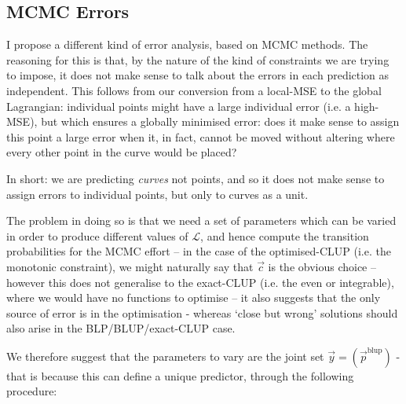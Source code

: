 \documentclass[]{article}
\begin{document}


				

		\subsection{MCMC Errors}

			I propose a different kind of error analysis, based on MCMC methods. The reasoning for this is that, by the nature of the kind of constraints we are trying to impose, it does not make sense to talk about the errors in each prediction as independent. This follows from our conversion from a local-MSE to the global Lagrangian: individual points might have a large individual error (i.e. a high-MSE), but which ensures a globally minimised error: does it make sense to assign this point a large error when it, in fact, cannot be moved without altering where every other point in the curve would be placed? 

			In short: we are predicting \textit{curves} not points, and so it does not make sense to assign errors to individual points, but only to curves as a unit. 

			The problem in doing so is that we need a set of parameters which can be varied in order to produce different values of $\mathcal{L}$, and hence compute the transition probabilities for the MCMC effort -- in the case of the optimised-CLUP (i.e. the monotonic constraint), we might naturally say that $\vec{c}$ is the obvious choice -- however this does not generalise to the exact-CLUP (i.e. the even or integrable), where we would have no functions to optimise -- it also suggests that the only source of error is in the optimisation - whereas `close but wrong' solutions should also arise in the BLP/BLUP/exact-CLUP case. 

			We therefore suggest that the parameters to vary are the joint set $\vec{y} = (\vec{p}^\text{blup})$ - that is because this can define a unique predictor, through the following procedure:
\end{document}
